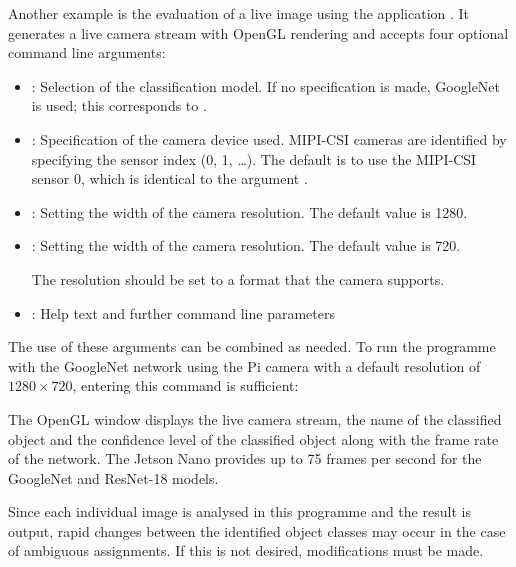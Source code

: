 Another example is the evaluation of a live image using the application . It generates a live camera stream with OpenGL rendering and accepts four optional command line arguments: 

\begin{itemize}
  \item [] : Selection of the classification model. If no specification is made, GoogleNet is used; this corresponds to .
  \item [] : Specification of the camera device used. MIPI-CSI cameras are identified by specifying the sensor index (0, 1, \ldots). The default is to use the MIPI-CSI sensor 0, which is identical to the argument .
  \item [] : Setting the width of the camera resolution. The default value is 1280.
  \item [] : Setting the width of the camera resolution. The default value is 720.
  
           The resolution should be set to a format that the camera supports.
  \item []  : Help text and further command line parameters
\end{itemize}



The use of these arguments can be combined as needed. To run the programme with the GoogleNet network using the Pi camera with a default resolution of $1280 \times 720$, entering this command is sufficient:

\medskip


\medskip

The OpenGL window displays the live camera stream, the name of the classified object and the confidence level of the classified object along with the frame rate of the network. The Jetson Nano provides up to 75 frames per second for the GoogleNet and ResNet-18 models. 

\medskip

Since each individual image is analysed in this programme and the result is output, rapid changes between the identified object classes may occur in the case of ambiguous assignments. If this is not desired, modifications must be made.



